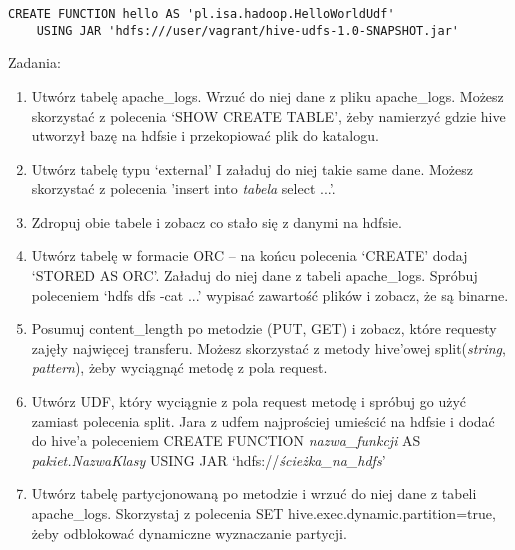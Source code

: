 \documentclass[11pt]{article}
\begin{document}
\begin{lstlisting}
CREATE FUNCTION hello AS 'pl.isa.hadoop.HelloWorldUdf'
	USING JAR 'hdfs:///user/vagrant/hive-udfs-1.0-SNAPSHOT.jar'
\end{lstlisting}

\pagebreak

Zadania:
\begin{enumerate}
\item Utwórz tabelę apache\_logs. Wrzuć do niej dane z pliku apache\_logs. Możesz skorzystać z polecenia ‘SHOW CREATE TABLE’, żeby namierzyć gdzie hive utworzył bazę na hdfsie i przekopiować plik do katalogu.
\item Utwórz tabelę typu ‘external’ I załaduj do niej takie same dane. Możesz skorzystać z polecenia 'insert into \textit{tabela} select ...'.
\item Zdropuj obie tabele i zobacz co stało się z danymi na hdfsie.
\item Utwórz tabelę w formacie ORC – na końcu polecenia ‘CREATE’ dodaj ‘STORED AS ORC’. Załaduj do niej dane z tabeli apache\_logs. Spróbuj poleceniem ‘hdfs dfs -cat ...’ wypisać zawartość plików i zobacz, że są binarne.
\item Posumuj content\_length po metodzie (PUT, GET) i zobacz, które requesty zajęły najwięcej transferu. Możesz skorzystać z metody hive’owej split(\textit{string}, \textit{pattern}), żeby wyciągnąć metodę z pola request.
\item Utwórz UDF, który wyciągnie z pola request metodę i spróbuj go użyć zamiast polecenia split. Jara z udfem najprościej umieścić na hdfsie i dodać do hive’a poleceniem CREATE FUNCTION \textit{nazwa\_funkcji} AS \textit{pakiet.NazwaKlasy} USING JAR ‘hdfs://\textit{ścieżka\_na\_hdfs}’
\item Utwórz tabelę partycjonowaną po metodzie i wrzuć do niej dane z tabeli apache\_logs. Skorzystaj z polecenia SET hive.exec.dynamic.partition=true, żeby odblokować dynamiczne wyznaczanie partycji.
\end{enumerate}
\end{document}
